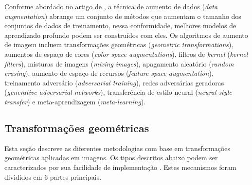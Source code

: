 \documentclass[
	12pt,				%
	oneside,			%
	a4paper,			%
	english,			%
	brazil				%
	]{abntex2ppgsi}
\begin{document}
Conforme abordado no artigo de , a técnica de aumento de dados (\textit{data augmentation}) abrange um conjunto de métodos que aumentam o tamanho dos conjuntos de dados de treinamento, nessa conformidade, melhores modelos de aprendizado profundo podem ser construídos com eles. Os algoritmos de aumento de imagem incluem transformações geométricas (\textit{geometric transformations}), aumentos de espaço de cores (\textit{color space augmentations}), filtros de \textit{kernel} (\textit{kernel filters}), misturas de imagens (\textit{mixing images}), apagamento aleatório (\textit{random erasing}), aumento de espaço de recursos (\textit{feature space augmentation}), treinamento adversário (\textit{adversarial training}), redes adversárias geradoras (\textit{generative adversarial networks}), transferência de estilo neural (\textit{neural style transfer}) e meta-aprendizagem (\textit{meta-learning}).

\subsection{Transformações geométricas}

Esta seção descreve as diferentes metodologias com base em transformações geométricas aplicadas em imagens. Os tipos descritos abaixo podem ser caracterizados por sua facilidade de implementação \cite{shorten2019survey}. Estes mecanismos foram divididos em 6 partes principais.
\end{document}
